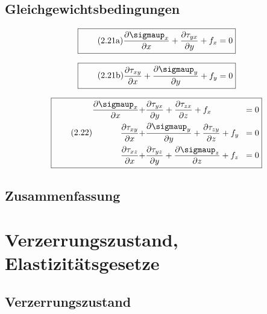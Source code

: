 \documentclass[11pt]{article}
\newcommand{\1}{ {\mathds{1}} }
\renewcommand{\sigma  }{\sigmaup   }
\begin{document}
		\subsection{Gleichgewichtsbedingungen}

		\begin{equation}
			\boxed{
				\tag{2.21a}
				\begin{split}
					\frac{\partial\sigma_x}{\partial x}
					+
					\frac{\partial\tau_{yx}}{\partial y}
					+
					f_x
					=
					0
				\end{split}
			}
		\end{equation}

		\begin{equation}
			\boxed{
				\tag{2.21b}
				\begin{split}
					\frac{\partial\tau_{xy}}{\partial x}
					+
					\frac{\partial\sigma_{y}}{\partial y}
					+
					f_y
					=
					0
				\end{split}
			}
		\end{equation}

		\begin{equation}
			\boxed{
				\tag{2.22}
				\begin{split}
					\frac{\partial\sigma_{x}}{\partial x}
					+
					&\frac{\partial\tau_{yx}}{\partial y}
					+
					\frac{\partial\tau_{zx}}{\partial z}
					+
					f_x\!&= 0 \\
					\frac{\partial\tau_{xy}}{\partial x}
					+
					&\frac{\partial\sigma_{y}}{\partial y}
					+
					\frac{\partial\tau_{zy}}{\partial z}
					+
					f_y\!&= 0 \\
					\frac{\partial\tau_{xz}}{\partial x}
					+
					&\frac{\partial\tau_{yz}}{\partial y}
					+
					\frac{\partial\sigma_{z}}{\partial z}
					+
					f_z\!&= 0 \\
				\end{split}
			}
		\end{equation}		

		\subsection{Zusammenfassung}
		
		\section{Verzerrungszustand, Elastizitätsgesetze}
		\subsection{Verzerrungszustand}
\end{document}
